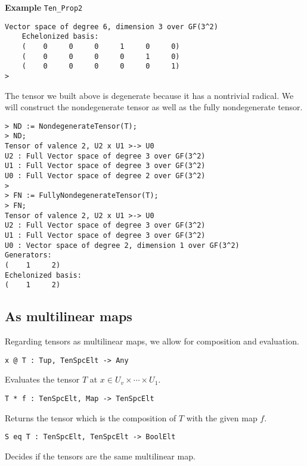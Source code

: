 \begin{framed} {\bf Example} {\tt Ten\_Prop2}
{\begin{lstlisting}[frame=single,basicstyle=\ttfamily\color{black!30!
teal},backgroundcolor=\color{white!70!gray}]
    Vector space of degree 6, dimension 3 over GF(3^2)
    Echelonized basis:
    (    0     0     0     1     0     0)
    (    0     0     0     0     1     0)
    (    0     0     0     0     0     1)
>
\end{lstlisting}
The tensor we built above is degenerate because it has a nontrivial radical. 
We will construct the nondegenerate tensor as well as the fully nondegenerate tensor.
\begin{lstlisting}[frame=single,basicstyle=\ttfamily\color{black!30!
teal},backgroundcolor=\color{white!70!gray}]
> ND := NondegenerateTensor(T);
> ND;
Tensor of valence 2, U2 x U1 >-> U0
U2 : Full Vector space of degree 3 over GF(3^2)
U1 : Full Vector space of degree 3 over GF(3^2)
U0 : Full Vector space of degree 2 over GF(3^2)
> 
> FN := FullyNondegenerateTensor(T);
> FN;
Tensor of valence 2, U2 x U1 >-> U0
U2 : Full Vector space of degree 3 over GF(3^2)
U1 : Full Vector space of degree 3 over GF(3^2)
U0 : Vector space of degree 2, dimension 1 over GF(3^2)
Generators:
(    1     2)
Echelonized basis:
(    1     2)
\end{lstlisting} }
\end{framed}

\subsection{As multilinear maps}
Regarding tensors as multilinear maps, we allow for composition and evaluation.

\color{blue}
{\small \begin{verbatim}
x @ T : Tup, TenSpcElt -> Any
\end{verbatim} }
\color{black}

Evaluates the tensor $T$ at $x\in U_v\times \cdots \times U_1$.

\color{blue}
{\small \begin{verbatim}
T * f : TenSpcElt, Map -> TenSpcElt
\end{verbatim} }
\color{black}

Returns the tensor which is the composition of $T$ with the given map $f$.

\color{blue}
{\small \begin{verbatim}
S eq T : TenSpcElt, TenSpcElt -> BoolElt
\end{verbatim} }
\color{black}

Decides if the tensors are the same multilinear map.

